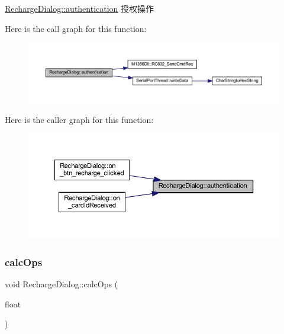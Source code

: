 \mbox{\hyperlink{class_recharge_dialog_a2dedb3b3a01202645d6375e41282bb11}{Recharge\+Dialog\+::authentication}} 授权操作 

Here is the call graph for this function\+:
\nopagebreak
\begin{figure}[H]
\begin{center}
\leavevmode
\includegraphics[width=350pt]{class_recharge_dialog_a2dedb3b3a01202645d6375e41282bb11_cgraph}
\end{center}
\end{figure}
Here is the caller graph for this function\+:
\nopagebreak
\begin{figure}[H]
\begin{center}
\leavevmode
\includegraphics[width=350pt]{class_recharge_dialog_a2dedb3b3a01202645d6375e41282bb11_icgraph}
\end{center}
\end{figure}
\mbox{\label{class_recharge_dialog_a9048dce00d14b245f88e8059db81db63}} 
\subsubsection{\texorpdfstring{calcOps}{calcOps}}
{\footnotesize\ttfamily void Recharge\+Dialog\+::calc\+Ops (\begin{DoxyParamCaption}\item[{float}]{ }\end{DoxyParamCaption})\hspace{0.3cm}{\ttfamily [signal]}}

